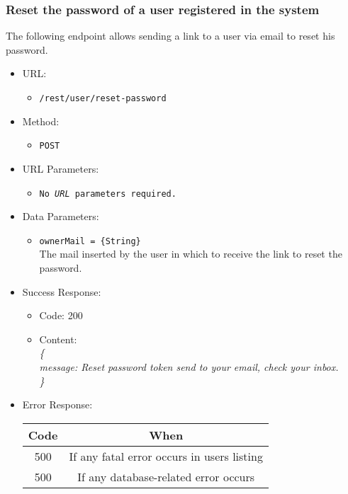 \newpage
\subsubsection*{Reset the password of a user registered in the system}

The following endpoint allows sending a link to a user via email to reset his password.

\begin{itemize}

    \item URL: 
    \begin{itemize}
        \item \texttt{/rest/user/reset-password}
    \end{itemize}
    
    \item Method: 
    \begin{itemize}
        \item \texttt{POST}
    \end{itemize}
    
    \item URL Parameters: 
    \begin{itemize}
        \item \texttt{No \textit{URL} parameters required.} 
    \end{itemize}
    
    \item Data Parameters: 
    \begin{itemize}
        \item \texttt{ownerMail = \{String\}} \\
        The mail inserted by the user in which to receive the link to reset the password.    
    \end{itemize}
    
    \item Success Response: 
    \begin{itemize}
        \item Code: 200
        \item Content: \\
        \textit{
\{ \\
message: Reset password token send to your email, check your inbox. \\
\}
        }
    \end{itemize}
    
    \item Error Response:
    \begin{table}[!h]
    \centering 
    \begin{tabular}{|c|c|}
    \hline
    \multicolumn{1}{|c|}{\textbf{Code}} & \multicolumn{1}{c|}{\textbf{When}} \\ \hline
    500 & If any fatal error occurs in users listing \\\hline
    500 & If any database-related error occurs \\\hline
    \end{tabular} 
    \end{table} 
    
\end{itemize}



